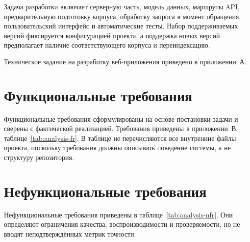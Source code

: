 Задача разработки включает серверную часть, модель данных, маршруты API, предварительную подготовку корпуса, обработку запроса в момент обращения, пользовательский интерфейс и автоматические тесты. Набор поддерживаемых версий фиксируется конфигурацией проекта, а поддержка новых версий предполагает наличие соответствующего корпуса и переиндексацию.

Техническое задание на разработку веб-приложения приведено в приложении~А.

\section{Функциональные требования}

Функциональные требования сформулированы на основе постановки задачи и сверены с фактической реализацией. Требования приведены в приложении~В, таблице~\ref{tab:analysis-fr}. В таблице не перечисляются все внутренние файлы проекта, поскольку требования должны описывать поведение системы, а не структуру репозитория.

\section{Нефункциональные требования}

Нефункциональные требования приведены в таблице~\ref{tab:analysis-nfr}. Они определяют ограничения качества, воспроизводимости и проверяемости, но не вводят неподтверждённых метрик точности.

